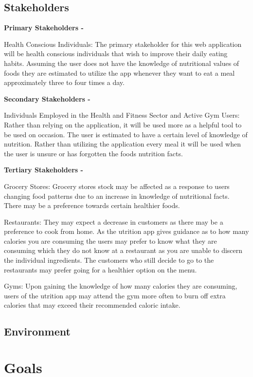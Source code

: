 \documentclass{article}
\begin{document}
\subsection{Stakeholders}

\textbf{Primary Stakeholders - } 

Health Conscious Individuals: The primary stakeholder for this web application will be health conscious individuals that wish to improve their daily eating habits. Assuming the user does not have the knowledge of nutritional values of foods they are estimated to utilize the app whenever they want to eat a meal approximately three to four times a day.

\textbf{Secondary Stakeholders - } 

Individuals Employed in the Health and Fitness Sector and Active Gym Users: Rather than relying on the application, it will be used more as a helpful tool to be used on occasion. The user is estimated to have a certain level of knowledge of nutrition. Rather than utilizing the application every meal it will be used when the user is unsure or has forgotten the foods nutrition facts.

\textbf{Tertiary Stakeholders - } 

Grocery Stores: Grocery stores stock may be affected as a response to users changing food patterns due to an increase in knowledge of nutritional facts. There may be a preference towards certain healthier foods.

Restaurants: They may expect a decrease in customers as there may be a preference to cook from home. As the utrition app gives guidance as to how many calories you are consuming the users may prefer to know what they are consuming which they do not know at a restaurant as you are unable to discern the individual ingredients. The customers who still decide to go to the restaurants may prefer going for a healthier option on the menu.

Gyms: Upon gaining the knowledge of how many calories they are consuming, users of the utrition app may attend the gym more often to burn off extra calories that may exceed their recommended caloric intake. 


\subsection{Environment}


\section{Goals}
\end{document}
